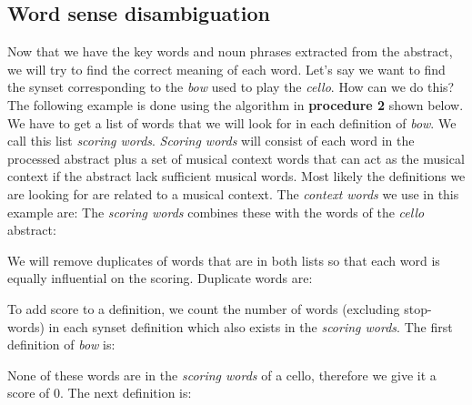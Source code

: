 
\subsection{Word sense disambiguation}
Now that we have the key words and noun phrases extracted from the abstract, we will try to find the correct meaning of each word. Let's say we want to find the synset corresponding to the \emph{bow} used to play the \emph{cello}. How can we do this? The following example is done using the algorithm in \textbf{procedure 2} shown below. We have to get a list of words that we will look for in each definition of \emph{bow}. We call this list \emph{scoring words}. \emph{Scoring words} will consist of each word in the processed abstract plus a set of musical context words that can act as the musical context if the abstract lack sufficient musical words. Most likely the definitions we are looking for are related to a musical context. The \emph{context words} we use in this example are:
\noindent{}
The \emph{scoring words} combines these with the words of the \emph{cello} abstract:

\noindent{}
We will remove duplicates of words that are in both lists so that each word is equally influential on the scoring. Duplicate words are:

\noindent{}

To add score to a definition, we count the number of words (excluding stop-words) in each synset definition which also exists in the \emph{scoring words}. The first definition of \emph{bow} is:

\noindent{}
None of these words are in the \emph{scoring words} of a cello, therefore we give it a score of 0. The next definition is:


